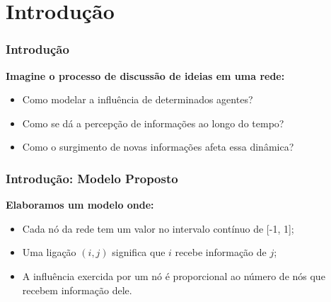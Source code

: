 
\section{Introdução}

\begin{frame}
  \frametitle{Introdução}

  \textbf{Imagine o processo de discussão de ideias em uma rede:}

  \begin{alertblock}{}
    \vspace{5mm}

    \begin{itemize}
      \item Como modelar a influência de determinados agentes?
      \item Como se dá a percepção de informações ao longo do tempo?
      \item Como o surgimento de novas informações afeta essa dinâmica?
    \end{itemize}
    \vspace{5mm}

  \end{alertblock}
\end{frame}

\begin{frame}
  \frametitle{Introdução: Modelo Proposto}

  \textbf{Elaboramos um modelo onde:}

  \begin{alertblock}{}
    \vspace{5mm}

    \begin{itemize}
      \item Cada nó da rede tem um valor no intervalo contínuo de [-1, 1];
      \item Uma ligação $(i, j)$ significa que $i$ recebe informação de $j$;
      \vspace{5mm}

      \item A influência exercida por um nó é proporcional ao número de nós que
        recebem informação dele.
    \end{itemize}
    \vspace{5mm}

  \end{alertblock}
\end{frame}

